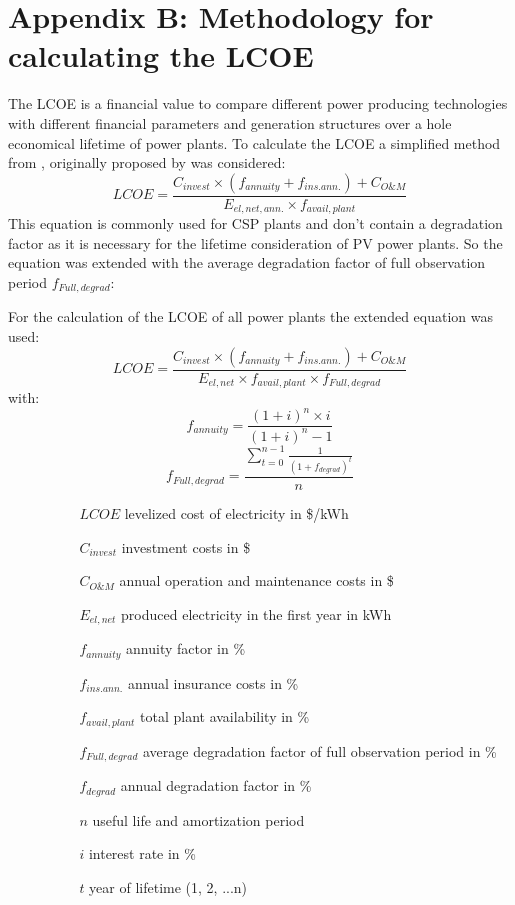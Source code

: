 \documentclass[Master,MEE,english]{twbook}%
\begin{document}
\chapter{Appendix B: Methodology for calculating the LCOE} \label{ChapterLCOE}
The LCOE is a financial value to compare different power producing technologies with different financial parameters and generation structures over a hole economical lifetime of power plants. To calculate the LCOE a simplified method from \cite{Morin2012}, originally proposed by \cite{Roy1997} was considered:
\begin{equation}
LCOE=\frac{C_{invest}\times(f_{annuity}+f_{ins.ann.})+C_{O\&M}}{E_{el,net,ann.}\times f_{avail,plant}} \label{LCOEold}
\end{equation}
This equation is commonly used for CSP plants and don't contain a degradation factor as it is necessary for the lifetime consideration of PV power plants. So the equation was extended with the average degradation factor of full observation period $f_{Full,degrad}$:

For the calculation of the LCOE of all power plants the extended equation was used:
\begin{equation}
LCOE=\frac{C_{invest}\times(f_{annuity}+f_{ins.ann.})+C_{O\&M}}{E_{el,net}\times f_{avail,plant} \times f_{Full,degrad}}\label{LCOE}
\end{equation}
with:
\begin{equation}
f_{annuity} = \frac{(1+i)^n \times i}{(1+i)^n-1} \label{annuity}
\end{equation}
\begin{equation}
f_{Full,degrad} = \frac{\sum\limits_{t=0}^{n-1} \frac{1}{(1+f_{degrad})^{t}}}{n} \label{GL_Degradationfactor}
\end{equation} 
\begin{itemize}
\item[ ] 
\begin{itemize}
\item[ ] 
\begin{itemize}
\item[$LCOE$]levelized cost of electricity in \$/kWh
\item[$C_{invest}$]investment costs in \$
\item[$C_{O\&M}$]annual operation and maintenance costs in \$
\item[$E_{el,net}$]produced electricity in the first year in kWh
\item[$f_{annuity}$]annuity factor in \%
\item[$f_{ins.ann.}$]annual insurance costs in \%
\item[$f_{avail,plant}$]total plant availability in \%
\item[$f_{Full,degrad}$]average degradation factor of full observation period in \%
\item[$f_{degrad}$]annual degradation factor in \%
\item[$n$]useful life and amortization period
\item[$i$]interest rate in \%
\item[$t$]year of lifetime (1, 2, ...n)
\end{itemize}
\end{itemize}
\end{itemize}
\end{document}
